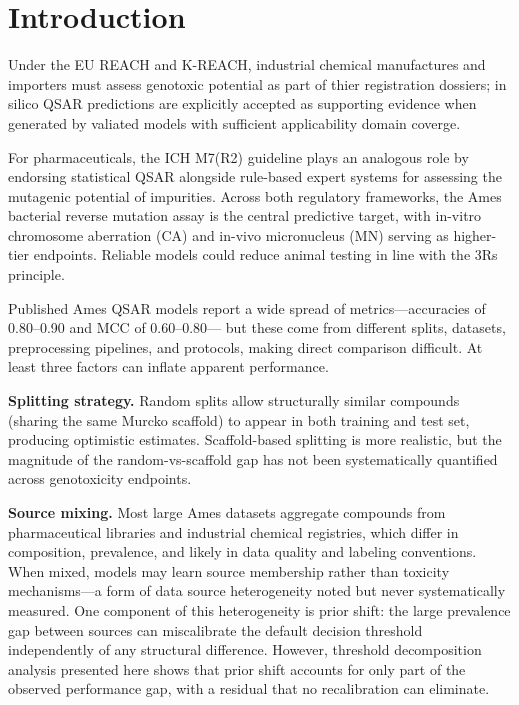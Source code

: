 \section{Introduction}

Under the EU REACH\cite{EU_REACH_2006} and K-REACH, industrial chemical manufactures and importers must assess genotoxic potential as part of thier registration dossiers;
in silico QSAR predictions are explicitly accepted as supporting evidence when generated by valiated models with sufficient applicability domain coverge.\cite{ECHA_QSAR_2008}

For pharmaceuticals, the ICH M7(R2) guideline plays an analogous role by endorsing statistical QSAR alongside rule-based expert systems for assessing the mutagenic potential of impurities.\cite{ICH_M7_2017} 
Across both regulatory frameworks, the Ames bacterial reverse mutation assay\cite{Ames_1973,Mortelmans_2000} 
is the central predictive target, with in-vitro chromosome aberration (CA) and in-vivo micronucleus (MN)\cite{OECD_473,OECD_474} serving as higher-tier endpoints. 
Reliable models could reduce animal testing in line with the 3Rs principle.\cite{Russell_Burch_1959}

Published Ames QSAR models report a wide spread of metrics---accuracies of 0.80--0.90 and MCC of 0.60--0.80\cite{Hansen_2009,Xu_2012,Honma_2019,Li_2021}---
but these come from different splits, datasets, preprocessing pipelines, and protocols, making direct comparison difficult. At least three factors can inflate apparent performance.

\textbf{Splitting strategy.} Random splits allow structurally similar compounds (sharing the same Murcko scaffold\cite{Bemis_Murcko_1996}) to appear in both training and test set, 
producing optimistic estimates. Scaffold-based splitting\cite{Sheridan_2013,Wu_MoleculeNet_2018} is more realistic, but the magnitude of the random-vs-scaffold gap has not been systematically 
quantified across genotoxicity endpoints.

\textbf{Source mixing.} Most large Ames datasets aggregate compounds from pharmaceutical libraries and industrial chemical registries,\cite{Hansen_2009,Honma_2019} 
which differ in composition, prevalence, and likely in data quality and labeling conventions. When mixed, models may learn source membership rather than 
toxicity mechanisms---a form of data source heterogeneity noted\cite{Tropsha_2010,Hanser_2016} but never systematically measured. 
One component of this heterogeneity is prior shift: the large prevalence gap between sources can miscalibrate the default decision threshold independently of any structural difference. 
However, threshold decomposition analysis presented here shows that prior shift accounts for only part of the observed performance gap, with a residual that no recalibration can eliminate.


